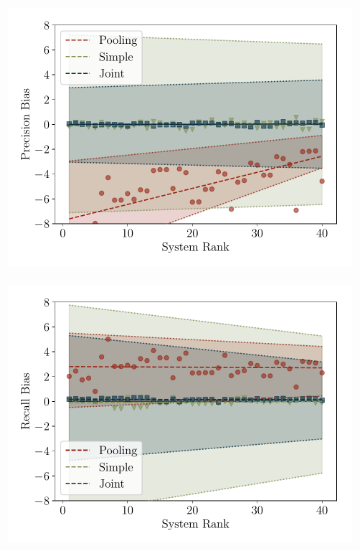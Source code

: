 \begin{figure}
  \begin{subfigure}{0.49\textwidth}
    \centering
    \includegraphics[width=\textwidth]{figures/simulation/simulation-p}
    \caption{}
  \end{subfigure}
  \hfill
  \begin{subfigure}{0.49\textwidth}
    \centering
    \includegraphics[width=\textwidth]{figures/simulation/simulation-r}
    \caption{}
  \end{subfigure} \\


\end{figure}
